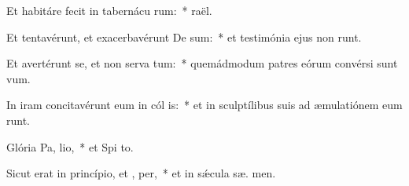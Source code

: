 \item Et habitáre fecit in tabernácu rum:~*  raël.
\item Et tentavérunt, et exacerbavérunt De sum:~* et testimónia ejus non runt.
\item Et avertérunt se, et non serva tum:~* quemádmodum patres eórum convérsi sunt   vum.
\item In iram concitavérunt eum in cól is:~* et in sculptílibus suis ad æmulatiónem eum runt.
\item Glória Pa,  lio,~* et Spi to.
\item Sicut erat in princípio, et ,  per,~* et in sǽcula sæ. men.
